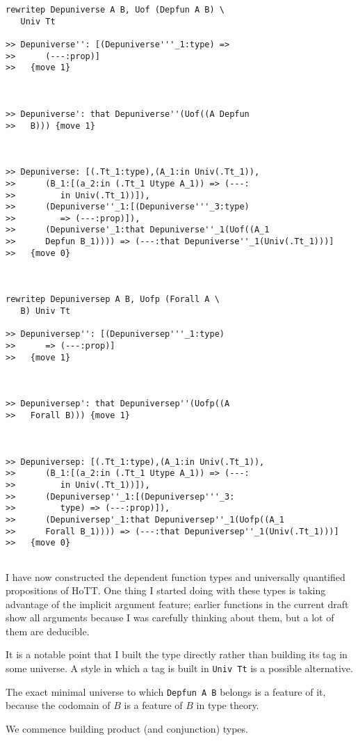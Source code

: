\documentclass{article}
\begin{document}
\begin{verbatim}
rewritep Depuniverse A B, Uof (Depfun A B) \
   Univ Tt

>> Depuniverse'': [(Depuniverse'''_1:type) =>
>>      (---:prop)]
>>   {move 1}



>> Depuniverse': that Depuniverse''(Uof((A Depfun
>>   B))) {move 1}



>> Depuniverse: [(.Tt_1:type),(A_1:in Univ(.Tt_1)),
>>      (B_1:[(a_2:in (.Tt_1 Utype A_1)) => (---:
>>         in Univ(.Tt_1))]),
>>      (Depuniverse''_1:[(Depuniverse'''_3:type)
>>         => (---:prop)]),
>>      (Depuniverse'_1:that Depuniverse''_1(Uof((A_1
>>      Depfun B_1)))) => (---:that Depuniverse''_1(Univ(.Tt_1)))]
>>   {move 0}



rewritep Depuniversep A B, Uofp (Forall A \
   B) Univ Tt

>> Depuniversep'': [(Depuniversep'''_1:type)
>>      => (---:prop)]
>>   {move 1}



>> Depuniversep': that Depuniversep''(Uofp((A
>>   Forall B))) {move 1}



>> Depuniversep: [(.Tt_1:type),(A_1:in Univ(.Tt_1)),
>>      (B_1:[(a_2:in (.Tt_1 Utype A_1)) => (---:
>>         in Univ(.Tt_1))]),
>>      (Depuniversep''_1:[(Depuniversep'''_3:
>>         type) => (---:prop)]),
>>      (Depuniversep'_1:that Depuniversep''_1(Uofp((A_1
>>      Forall B_1)))) => (---:that Depuniversep''_1(Univ(.Tt_1)))]
>>   {move 0}


\end{verbatim}

I have now constructed the dependent function types and universally quantified propositions of HoTT.  One thing I started doing with these types is taking advantage of the implicit argument feature;  earlier functions in the current draft show all arguments because I was carefully thinking about them, but a lot of them are deducible.

It is a notable point that I built the type directly rather than building its tag in some universe.  A style in which a tag is built in {\tt Univ Tt} is a possible alternative. 

The exact minimal universe to which {\tt Depfun A B} belongs is a feature of it, because the codomain of $B$ is a feature of $B$ in type theory.

We commence building product (and conjunction) types.
\end{document}
